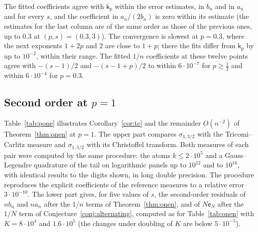 The fitted coefficients agree with $\mathsf k_p$ within the error estimates, in $b_n$ and in $a_n$ and for every $s$, and
the coefficient in $a_n/(2b_n)$ is zero within its estimate (the estimates for the last column are of the same order as
those of the previous ones, up to $0.3$ at $(p,s)=(0.3,3)$). The convergence is slowest at $p=0.3$, where the
next exponents $1+2p$ and $2$ are close to $1+p$; there the fits differ from $\mathsf k_p$ by up to $10^{-2}$, within
their range. The fitted $1/n$ coefficients at these twelve points agree with $-(s-1)/2$ and $-(s-1+p)/2$ to within
$6\cdot10^{-7}$ for $p\ge\frac12$ and within $6\cdot10^{-4}$ for $p=0.3$.

\subsection{\texorpdfstring{Second order at $p=1$}{Second order at p=1}}
Table~\ref{tab:pone} illustrates Corollary~\ref{cor:tc} and the remainder $O(n^{-2})$ of Theorem~\ref{thm:onen} at $p=1$.
The upper part compares $\sigma_{1,3/2}$ with the Tricomi--Carlitz measure and $\sigma_{1,5/2}$ with its Christoffel
transform. Both measures of each pair were computed by the same procedure: the atoms $k\le2\cdot10^5$ and a
Gauss--Legendre quadrature of the tail on logarithmic panels up to $10^{12}$ and to $10^{16}$, with identical results to
the digits shown, in long double precision. The procedure reproduces the explicit coefficients of the reference
measures to a relative error $3\cdot10^{-10}$. The lower part gives, for five values of $s$, the second-order residuals
of $nb_n$ and $na_n$ after the $1/n$ terms of Theorem~\ref{thm:onen}, and of $N\mathsf e_N$ after the $1/N$ term of
Conjecture~\ref{conj:alternating}, computed as for Table~\ref{tab:onen} with $K=8\cdot10^4$ and $1.6\cdot10^5$ (the
changes under doubling of $K$ are below $5\cdot10^{-5}$).


